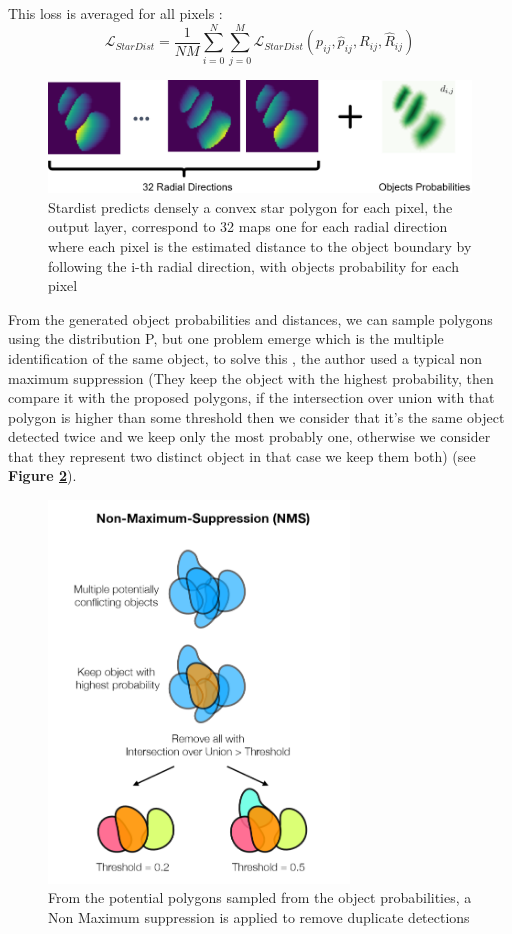 \documentclass[main.tex]{subfiles}
\begin{document}
This loss is averaged for all pixels :
\begin{equation}
    \mathcal{L}_{\mathit{StarDist}} = \frac{1}{NM}\sum_{i=0}^{N}\sum_{j=0}^{M}\mathcal{L}_{\mathit{StarDist}}(p_{ij}, \hat{p}_{ij}, R_{ij}, \hat{R}_{ij})
\end{equation}

\begin{figure}[H]
    \centering
    \includegraphics[width=16cm]{images/StardistPredictions.png}
    \caption{Stardist predicts densely a convex star polygon for each pixel, the output layer, correspond to 32 maps one for each radial direction where each pixel is the estimated distance to the object boundary by following the i-th radial direction, with objects probability for each pixel}
    \label{fig:stardistOutput}
\end{figure}

From the generated object probabilities and distances, we can sample polygons using the distribution P, but one problem emerge which is the multiple identification of the same object, to solve this , the author used a typical non maximum suppression (They keep the object with the highest probability, then compare it with the proposed polygons, if the intersection over union with that polygon is higher than some threshold then we consider that it's the same object detected twice and we keep only the most probably one, otherwise we consider that they represent two distinct object in that case we keep them both) (see \textbf{Figure \ref{fig:nms}}). 

\begin{figure}[H]
    \centering
    \includegraphics[width=8cm]{images/nms.png}
    \caption{From the potential polygons sampled from the object probabilities, a Non Maximum suppression is applied to remove duplicate detections}
    \label{fig:nms}
\end{figure}
\end{document}
